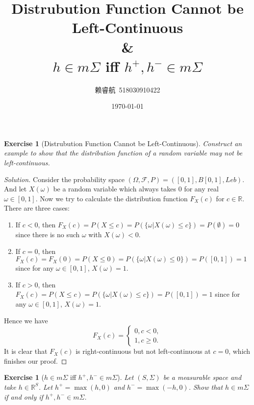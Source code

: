 \documentclass[a4paper, linespread=1.5]{article}
\newtheorem{exercise}[theorem]{Exercise}
\newcommand{\Real}{\mathbb{R}}
\begin{document}
    \title{Distrubution Function Cannot be Left-Continuous\\\&\\$h\in m\Sigma$ iff $h^+, h^- \in m\Sigma$}
    \author{赖睿航\ 518030910422}
    \date{\today}
    \maketitle

    \begin{exercise}[Distrubution Function Cannot be Left-Continuous]
        Construct an example to show that the distribution function of a random variable may not be left-continuous.
    \end{exercise}

    \begin{proof}[Solution]
        Consider the probability space $(\Omega, \mathcal{F}, P) = ([0, 1], B[0, 1], Leb)$. And let $X(\omega)$ be a random variable which always takes $0$ for any real $\omega \in [0, 1]$. Now we try to calculate the distribution function $F_X(c)$ for $c \in \Real$. There are three cases:
        
        \begin{enumerate}
            \item If $c < 0$, then $F_X(c) = P(X \leqslant c) = P(\{\omega | X(\omega) \leqslant c\}) = P(\emptyset) = 0$ since there is no such $\omega$ with $X(\omega) < 0$.
            \item If $c = 0$, then $F_X(c) = F_X(0) = P(X \leqslant 0) = P(\{\omega | X(\omega) \leqslant 0\}) = P([0, 1]) = 1$ since for any $\omega \in [0, 1]$, $X(\omega) = 1$.
            \item If $c > 0$, then $F_X(c) = P(X \leqslant c) = P(\{\omega | X(\omega) \leqslant c\}) = P([0, 1]) = 1$ since for any $\omega \in [0, 1]$, $X(\omega) = 1$.
        \end{enumerate}
        
        Hence we have
        $$
        F_X(c) = \left\{
        \begin{aligned}
            0, c < 0, \\
            1, c \geqslant 0.
        \end{aligned}
        \right.
        $$
        It is clear that $F_X(c)$ is right-continuous but not left-continuous at $c = 0$, which finishes our proof.
    \end{proof}
    \vspace{5mm}
    
    \begin{exercise}[$h\in m\Sigma$ iff $h^+, h^- \in m\Sigma$]
        Let $(S, \Sigma)$ be a measurable space and take $h \in \Real^S$. Let $h^+ = \max(h, 0)$ and $h^- = \max(-h, 0)$. Show that $h \in m\Sigma$ if and only if $h^+, h^- \in m\Sigma$.
    \end{exercise}
\end{document}

